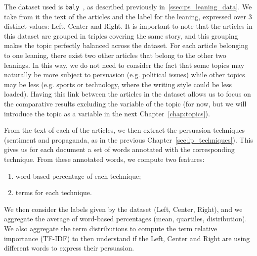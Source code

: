 The dataset used is \texttt{baly}~\citep{baly2020we}, as described previously in~\ref{ssec:ps_leaning_data}.
We take from it the text of the articles and the label for the leaning, expressed over 3 distinct values: Left, Center and Right.
It is important to note that the articles in this dataset are grouped in triples covering the same story, and this grouping makes the topic perfectly balanced across the dataset. For each article belonging to one leaning, there exist two other articles that belong to the other two leanings.
In this way, we do not need to consider the fact that some topics may naturally be more subject to persuasion (e.g. political issues) while other topics may be less (e.g. sports or technology, where the writing style could be less loaded).
Having this link between the articles in the dataset allows us to focus on the comparative results excluding the variable of the topic (for now, but we will introduce the topic as a variable in the next Chapter~\ref{chap:topics}).

From the text of each of the articles, we then extract the persuasion techniques (sentiment and propaganda, as in the previous Chapter~\ref{sec:lp_techniques}). This gives us for each document a set of words annotated with the corresponding technique. From these annotated words, we compute two features:
\begin{enumerate}
    \item word-based percentage of each technique;
    \item terms for each technique.
\end{enumerate}



We then consider the labels given by the dataset (Left, Center, Right), and we aggregate the average of word-based percentages (mean, quartiles, distribution). %
We also aggregate the term distributions to compute the term relative importance (TF-IDF) to then understand if the Left, Center and Right are using different words to express their persuasion.

